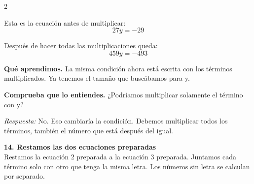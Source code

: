 \documentclass[11pt,a4paper,landscape]{article}
\begin{document}
\begin{multicols*}{2}
\begin{minipage}{\linewidth}
\par\smallskip Esta es la ecuación antes de multiplicar:
\[27y = -29\]
\par{}\par\smallskip
\par\smallskip Después de hacer todas las multiplicaciones queda:
\[459y = -493\]
\par\smallskip\textbf{Qué aprendimos.} La misma condición ahora está escrita con los términos multiplicados. Ya tenemos el tamaño que buscábamos para y.
\par\smallskip\textbf{Comprueba que lo entiendes.} ¿Podríamos multiplicar solamente el término con y?\par\textit{Respuesta:} No. Eso cambiaría la condición. Debemos multiplicar todos los términos, también el número que está después del igual.
\end{minipage}\par\medskip
\noindent\begin{minipage}{\linewidth}\textbf{14. Restamos las dos ecuaciones preparadas}\\[2pt]Restamos la ecuación 2 preparada a la ecuación 3 preparada. Juntamos cada término solo con otro que tenga la misma letra. Los números sin letra se calculan por separado.
\par{}\par\smallskip

\end{minipage}
\end{multicols*}
\end{document}
